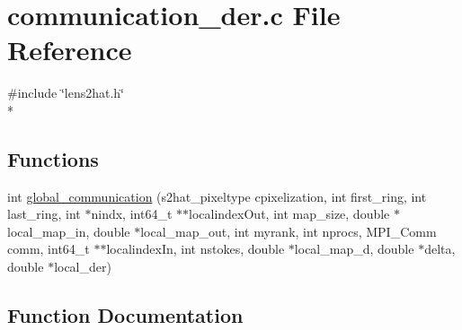 \section{communication\-\_\-der.\-c File Reference}
\label{derivatives__nersc_2communication__der_8c}
{\ttfamily \#include \char`\"{}lens2hat.\-h\char`\"{}}\\*
\subsection*{Functions}
\begin{DoxyCompactItemize}
\item 
int \hyperlink{derivatives__nersc_2communication__der_8c_a746636033c41a3cc98ac1eaa18476a04}{global\-\_\-communication} (s2hat\-\_\-pixeltype cpixelization, int first\-\_\-ring, int last\-\_\-ring, int $\ast$nindx, int64\-\_\-t $\ast$$\ast$localindex\-Out, int map\-\_\-size, double $\ast$local\-\_\-map\-\_\-in, double $\ast$local\-\_\-map\-\_\-out, int myrank, int nprocs, M\-P\-I\-\_\-\-Comm comm, int64\-\_\-t $\ast$$\ast$localindex\-In, int nstokes, double $\ast$local\-\_\-map\-\_\-d, double $\ast$delta, double $\ast$local\-\_\-der)
\end{DoxyCompactItemize}


\subsection{Function Documentation}
